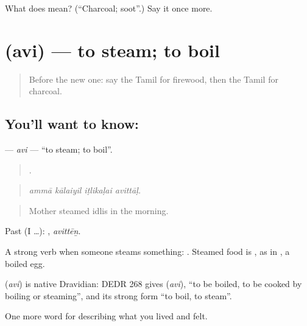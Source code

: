 \begin{tcolorbox}[breakable,colback=teal!4,colframe=teal!35!black,title={Before you move on}]
What does  mean? (\textquotedblleft{}Charcoal; soot\textquotedblright{}.) Say it once more.
\end{tcolorbox}
\section[\texorpdfstring{\ta{அவி} (avi)}{அவி (avi)}]{ (avi) — to steam; to boil}

\label{lesson:TA-C525-avi}



\begin{quote}
Before the new one: say the Tamil for firewood, then the Tamil for charcoal.
\end{quote}

\subsection*{You'll want to know: }
\textbf{} — \emph{avi} — \textquotedblleft{}to steam; to boil\textquotedblright{}.

\begin{quote}
   .
\end{quote}

\begin{quote}
\emph{ammā kālaiyil iṭlikaḷai avittāḷ.}
\end{quote}

\begin{quote}
Mother steamed idlis in the morning.
\end{quote}

Past (I …): , \emph{avittēṉ}.

A strong verb when someone steams something: . Steamed food is , as in  , a boiled egg.

\begin{cousinweb}
\textbf{} (\emph{avi}) is native Dravidian: DEDR 268 gives  (\emph{avi}), \textquotedblleft{}to be boiled, to be cooked by boiling or steaming\textquotedblright{}, and its strong form \textquotedblleft{}to boil, to steam\textquotedblright{}.
\end{cousinweb}

\begin{grammarlens}[title={What you've built}]
One more word for describing what you lived and felt.
\end{grammarlens}

